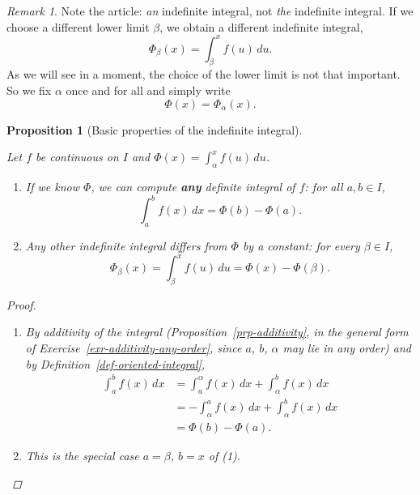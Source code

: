 \documentclass[
  letterpaper,
  DIV=11,
  numbers=noendperiod]{scrreprt}
\providecommand{\tightlist}{%
  \setlength{\itemsep}{0pt}\setlength{\parskip}{0pt}}
\theoremstyle{plain}
\theoremstyle{plain}
\newtheorem{proposition}{Proposition}[chapter]
\theoremstyle{definition}
\theoremstyle{definition}
\theoremstyle{definition}
\theoremstyle{plain}
\theoremstyle{plain}
\theoremstyle{remark}
\newtheorem{refremark}{Remark}[chapter]
\begin{document}
\begin{refremark}
Note the article: \emph{an} indefinite integral, not \emph{the}
indefinite integral. If we choose a different lower limit \(\beta\), we
obtain a different indefinite integral, \[
\Phi_\beta(x) = \int_\beta^x f(u)\,du.
\] As we will see in a moment, the choice of the lower limit is not that
important. So we fix \(\alpha\) once and for all and simply write \[
\Phi(x) = \Phi_\alpha(x).
\]

\label{rem-an-indefinite-integral}

\end{refremark}

\begin{proposition}[Basic properties of the indefinite
integral]\protect\hypertarget{prp-indefinite-integral-basic}{}\label{prp-indefinite-integral-basic}

Let \(f\) be continuous on \(I\) and
\(\Phi(x) = \int_\alpha^x f(u)\,du\).

\begin{enumerate}
\def\labelenumi{\arabic{enumi}.}
\tightlist
\item
  If we know \(\Phi\), we can compute \textbf{any} definite integral of
  \(f\): for all \(a,b\in I\), \[
  \int_a^b f(x)\,dx = \Phi(b) - \Phi(a).
  \]
\item
  Any other indefinite integral differs from \(\Phi\) by a constant: for
  every \(\beta\in I\), \[
  \Phi_\beta(x) = \int_\beta^x f(u)\,du = \Phi(x) - \Phi(\beta).
  \]
\end{enumerate}

\begin{proof}
\leavevmode

\begin{enumerate}
\def\labelenumi{(\arabic{enumi})}
\item
  By additivity of the integral (Proposition~\ref{prp-additivity}, in
  the general form of Exercise~\ref{exr-additivity-any-order}, since
  \(a\), \(b\), \(\alpha\) may lie in any order) and by
  Definition~\ref{def-oriented-integral}, \[
  \begin{aligned}
  \int_a^b f(x)\,dx
    &= \int_a^\alpha f(x)\,dx + \int_\alpha^b f(x)\,dx \\
    &= -\int_\alpha^a f(x)\,dx + \int_\alpha^b f(x)\,dx \\
    &= \Phi(b) - \Phi(a).
  \end{aligned}
  \]
\item
  This is the special case \(a = \beta\), \(b = x\) of (1).
\end{enumerate}

\end{proof}

\end{proposition}
\end{document}
